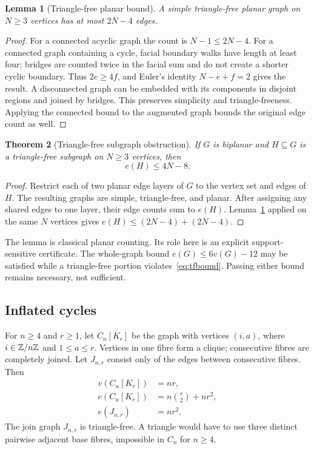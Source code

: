 \documentclass[11pt,letterpaper]{article}
\newtheorem{theorem}{Theorem}[section]
\newtheorem{lemma}[theorem]{Lemma}
\theoremstyle{definition}
\theoremstyle{remark}\newtheorem{remark}[theorem]{Remark}
\begin{document}
\begin{lemma}[Triangle-free planar bound]\label{lem:tfplane}
A simple triangle-free planar graph on $N\geq3$ vertices has at most $2N-4$ edges.
\end{lemma}
\begin{proof}
For a connected acyclic graph the count is $N-1\leq2N-4$. For a connected graph containing a cycle, facial boundary walks have length at least four; bridges are counted twice in the facial sum and do not create a shorter cyclic boundary. Thus $2e\geq4f$, and Euler's identity $N-e+f=2$ gives the result. A disconnected graph can be embedded with its components in disjoint regions and joined by bridges. This preserves simplicity and triangle-freeness. Applying the connected bound to the augmented graph bounds the original edge count as well.
\end{proof}

\begin{theorem}[Triangle-free subgraph obstruction]\label{thm:tfbiplanar}
If $G$ is biplanar and $H\subseteq G$ is a triangle-free subgraph on $N\geq3$ vertices, then
\begin{equation}\label{eq:tfbound}
e(H)\leq4N-8.
\end{equation}
\end{theorem}
\begin{proof}
Restrict each of two planar edge layers of $G$ to the vertex set and edges of $H$. The resulting graphs are simple, triangle-free, and planar. After assigning any shared edges to one layer, their edge counts sum to $e(H)$. Lemma~\ref{lem:tfplane} applied on the same $N$ vertices gives $e(H)\leq(2N-4)+(2N-4)$.
\end{proof}
The lemma is classical planar counting. Its role here is an explicit support-sensitive certificate. The whole-graph bound $e(G)\leq6v(G)-12$ may be satisfied while a triangle-free portion violates~\eqref{eq:tfbound}. Passing either bound remains necessary, not sufficient.

\subsection{Inflated cycles}
For $n\geq4$ and $r\geq1$, let $C_n[K_r]$ be the graph with vertices $(i,a)$, where $i\in\mathbb Z/n\mathbb Z$ and $1\leq a\leq r$. Vertices in one fibre form a clique; consecutive fibres are completely joined. Let $J_{n,r}$ consist only of the edges between consecutive fibres. Then
\begin{align}
v(C_n[K_r])&=nr,\\
e(C_n[K_r])&=n\binom r2+nr^2,\\
e(J_{n,r})&=nr^2.
\end{align}
The join graph $J_{n,r}$ is triangle-free. A triangle would have to use three distinct pairwise adjacent base fibres, impossible in $C_n$ for $n\geq4$.
\end{document}

